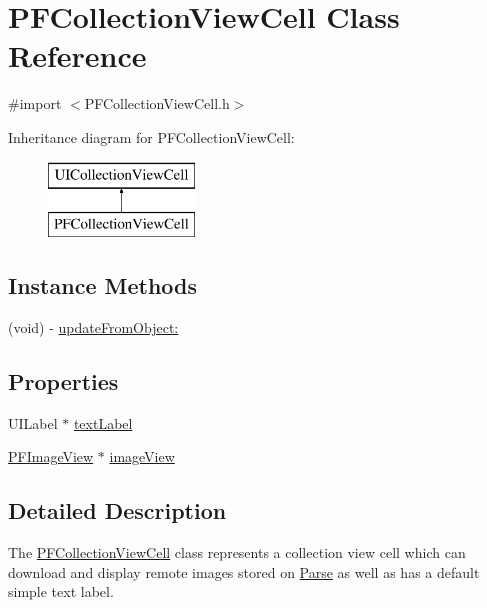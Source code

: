 \hypertarget{interface_p_f_collection_view_cell}{}\section{P\+F\+Collection\+View\+Cell Class Reference}
\label{interface_p_f_collection_view_cell}


{\ttfamily \#import $<$P\+F\+Collection\+View\+Cell.\+h$>$}

Inheritance diagram for P\+F\+Collection\+View\+Cell\+:\begin{figure}[H]
\begin{center}
\leavevmode
\includegraphics[height=2.000000cm]{interface_p_f_collection_view_cell}
\end{center}
\end{figure}
\subsection*{Instance Methods}
\begin{DoxyCompactItemize}
\item 
(void) -\/ \hyperlink{interface_p_f_collection_view_cell_adab59b6423a0f4977ccf15962bab5b6c}{update\+From\+Object\+:}
\end{DoxyCompactItemize}
\subsection*{Properties}
\begin{DoxyCompactItemize}
\item 
U\+I\+Label $\ast$ \hyperlink{interface_p_f_collection_view_cell_a7b74bb02a74dc52ce87a7b6b45d9feaf}{text\+Label}
\item 
\hyperlink{interface_p_f_image_view}{P\+F\+Image\+View} $\ast$ \hyperlink{interface_p_f_collection_view_cell_a8731a5d627f633ddd94e025606eafe72}{image\+View}
\end{DoxyCompactItemize}


\subsection{Detailed Description}
The {\ttfamily \hyperlink{interface_p_f_collection_view_cell}{P\+F\+Collection\+View\+Cell}} class represents a collection view cell which can download and display remote images stored on \hyperlink{interface_parse}{Parse} as well as has a default simple text label. 

